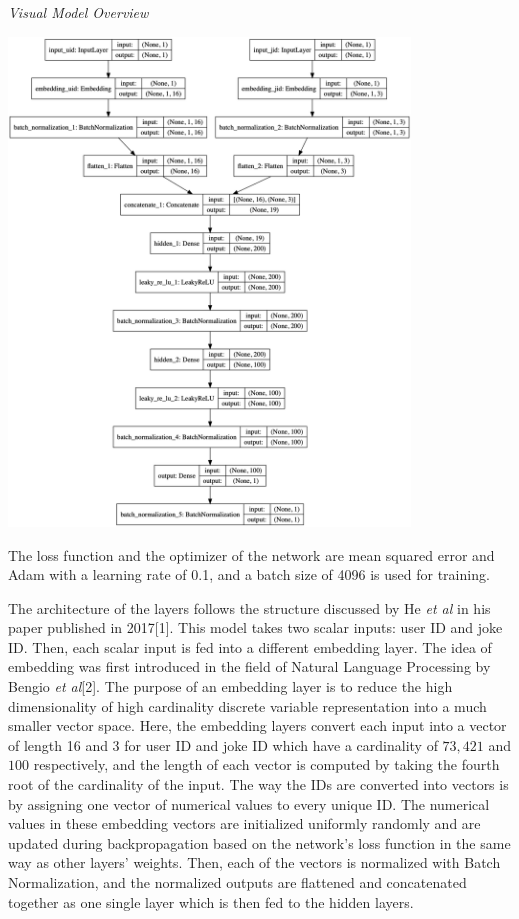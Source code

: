 \documentclass[12pt]{article}
\newcommand{\skipline}{\vspace{\baselineskip}}
\begin{document}
    \begin{center}
      \textit{Visual Model Overview}

      \skipline

      \includegraphics[width=0.8\textwidth]{model_plot.png}
    \end{center}

    \quad The loss function and the optimizer of the network are mean squared error and Adam with a learning rate of 0.1, and a batch size of 4096 is used for training.

    \quad The architecture of the layers follows the structure discussed by He \textit{et al} in his paper published in 2017[1]. This model takes two scalar inputs: user ID and joke ID. Then, each scalar input is fed into a different embedding layer. The idea of embedding was first introduced in the field of Natural Language Processing by Bengio \textit{et al}[2]. The purpose of an embedding layer is to reduce the high dimensionality of high cardinality discrete variable representation into a much smaller vector space. Here, the embedding layers convert each input into a vector of length 16 and 3 for user ID and joke ID which have a cardinality of $73,421$ and $100$ respectively, and the length of each vector is computed by taking the fourth root of the cardinality of the input. The way the IDs are converted into vectors is by assigning one vector of numerical values to every unique ID. The numerical values in these embedding vectors are initialized uniformly randomly and are updated during backpropagation based on the network's loss function in the same way as other layers' weights. Then, each of the vectors is normalized with Batch Normalization, and the normalized outputs are flattened and concatenated together as one single layer which is then fed to the hidden layers.
\end{document}
